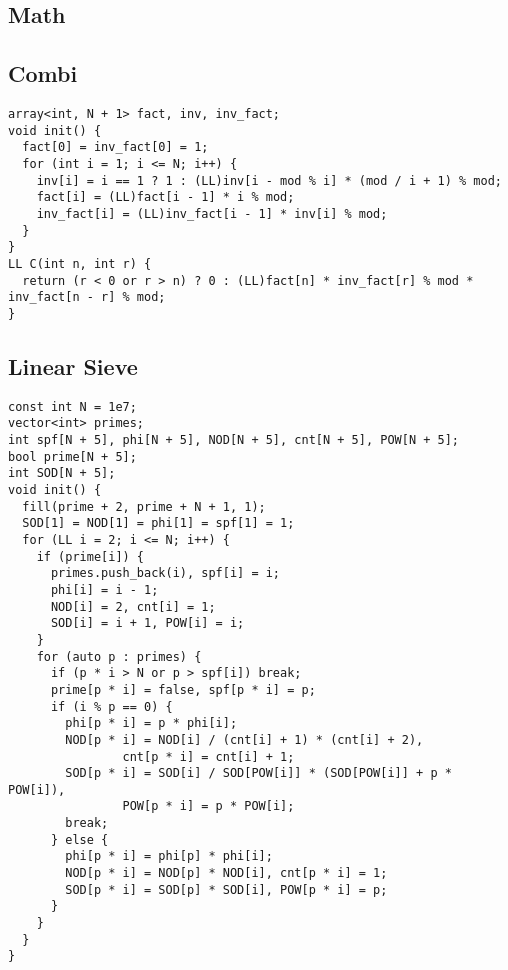 \documentclass[FSZ,a4paper,onesided]{article}
\begin{document}
\begin{multicols*}{\COLS}
\section{Math}
\subsection{Combi}
\begin{lstlisting}
array<int, N + 1> fact, inv, inv_fact;
void init() {
  fact[0] = inv_fact[0] = 1;
  for (int i = 1; i <= N; i++) {
    inv[i] = i == 1 ? 1 : (LL)inv[i - mod % i] * (mod / i + 1) % mod;
    fact[i] = (LL)fact[i - 1] * i % mod;
    inv_fact[i] = (LL)inv_fact[i - 1] * inv[i] % mod;
  }
}
LL C(int n, int r) {
  return (r < 0 or r > n) ? 0 : (LL)fact[n] * inv_fact[r] % mod * inv_fact[n - r] % mod;
}
\end{lstlisting}
\subsection{Linear Sieve}
\begin{lstlisting}
const int N = 1e7;
vector<int> primes;
int spf[N + 5], phi[N + 5], NOD[N + 5], cnt[N + 5], POW[N + 5];
bool prime[N + 5];
int SOD[N + 5];
void init() {
  fill(prime + 2, prime + N + 1, 1);
  SOD[1] = NOD[1] = phi[1] = spf[1] = 1;
  for (LL i = 2; i <= N; i++) {
    if (prime[i]) {
      primes.push_back(i), spf[i] = i;
      phi[i] = i - 1;
      NOD[i] = 2, cnt[i] = 1;
      SOD[i] = i + 1, POW[i] = i;
    }
    for (auto p : primes) {
      if (p * i > N or p > spf[i]) break;
      prime[p * i] = false, spf[p * i] = p;
      if (i % p == 0) {
        phi[p * i] = p * phi[i];
        NOD[p * i] = NOD[i] / (cnt[i] + 1) * (cnt[i] + 2),
                cnt[p * i] = cnt[i] + 1;
        SOD[p * i] = SOD[i] / SOD[POW[i]] * (SOD[POW[i]] + p * POW[i]),
                POW[p * i] = p * POW[i];
        break;
      } else {
        phi[p * i] = phi[p] * phi[i];
        NOD[p * i] = NOD[p] * NOD[i], cnt[p * i] = 1;
        SOD[p * i] = SOD[p] * SOD[i], POW[p * i] = p;
      }
    }
  }
}

\end{lstlisting}

\end{multicols*}
\end{document}
